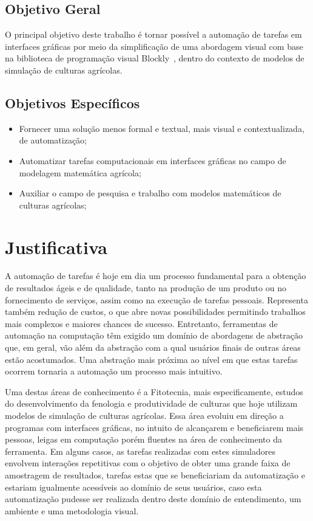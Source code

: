 \documentclass[12pt]{article}
\begin{document}
	\subsection{Objetivo Geral}
	
	O principal objetivo deste trabalho é tornar possível a automação de tarefas em interfaces gráficas por meio da simplificação de uma abordagem visual com base na biblioteca de programação visual Blockly~\cite{blockly}, dentro do contexto de modelos de simulação de culturas agrícolas.

	\subsection{Objetivos Específicos}
	
	\begin{itemize}
		\item Fornecer uma solução menos formal e textual, mais visual e contextualizada, de automatização;
		\item Automatizar tarefas computacionais em interfaces gráficas no campo de modelagem matemática agrícola;
		\item Auxiliar o campo de pesquisa e trabalho com modelos matemáticos de culturas agrícolas;
	\end{itemize}
	
	\section{Justificativa}	
	
	A automação de tarefas é hoje em dia um processo fundamental para a obtenção de resultados ágeis e de qualidade, tanto na produção de um produto ou no fornecimento de serviços, assim como na execução de tarefas pessoais. Representa também redução de custos, o que abre novas possibilidades permitindo trabalhos mais complexos e maiores chances de sucesso. Entretanto, ferramentas de automação na computação têm exigido um domínio de abordagens de abstração que, em geral, vão além da abstração com a qual usuários finais de outras áreas estão acostumados. Uma abstração mais próxima ao nível em que estas tarefas ocorrem tornaria a automação um processo mais intuitivo.
	
	Uma destas áreas de conhecimento é a Fitotecnia, mais especificamente, estudos do desenvolvimento da fenologia e produtividade de culturas que hoje utilizam modelos de simulação de culturas agrícolas. Essa área evoluiu em direção a programas com interfaces gráficas, no intuito de alcançarem e beneficiarem mais pessoas, leigas em computação porém fluentes na área de conhecimento da ferramenta. Em alguns casos, as tarefas realizadas com estes simuladores envolvem interações repetitivas com o objetivo de obter uma grande faixa de amostragem de resultados, tarefas estas que se beneficiariam da automatização e estariam igualmente acessíveis ao domínio de seus usuários, caso esta automatização pudesse ser realizada dentro deste domínio de entendimento, um ambiente e uma metodologia visual.  
	
\end{document}
